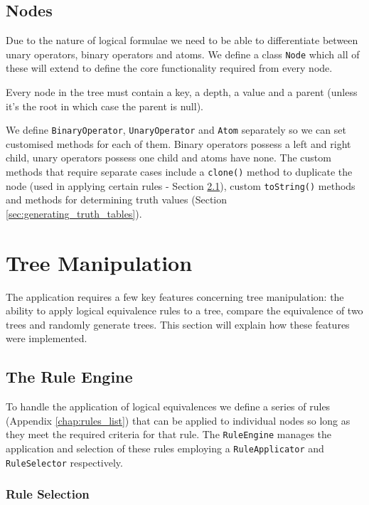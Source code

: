 \documentclass{report}
\begin{document}
\section{Nodes}

Due to the nature of logical formulae we need to be able to differentiate between unary operators, binary operators and atoms. We define a class {\tt Node} which all of these will extend to define the core functionality required from every node.

Every node in the tree must contain a key, a depth, a value and a parent (unless it's the root in which case the parent is null).

We define {\tt BinaryOperator}, {\tt UnaryOperator} and {\tt Atom} separately so we can set customised methods for each of them. Binary operators possess a left and right child, unary operators possess one child and atoms have none. The custom methods that require separate cases include a {\tt clone()} method to duplicate the node (used in applying certain rules - Section \ref{sec:the_rule_engine}), custom {\tt toString()} methods and methods for determining truth values (Section \ref{sec:generating_truth_tables}).

\chapter{Tree Manipulation}
\label{chap:tree_manipulation}

The application requires a few key features concerning tree manipulation: the ability to apply logical equivalence rules to a tree, compare the equivalence of two trees and randomly generate trees. This section will explain how these features were implemented.

\section{The Rule Engine}
\label{sec:the_rule_engine}

To handle the application of logical equivalences we define a series of rules (Appendix \ref{chap:rules_list}) that can be applied to individual nodes so long as they meet the required criteria for that rule. The {\tt RuleEngine} manages the application and selection of these rules employing a {\tt RuleApplicator} and {\tt RuleSelector} respectively.

\subsection{Rule Selection}
\label{sub:rule_selection}
\end{document}
